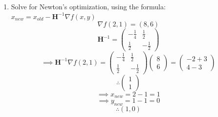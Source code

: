 \documentclass[11pt]{article}
\begin{document}
\begin{enumerate}
\[\begin{pmatrix}
\end{pmatrix} + 
\begin{pmatrix}
-2 \\ 1
\end{pmatrix}
\]
\[
\therefore \begin{pmatrix}
0 \\ 1
\end{pmatrix}
\]
\[
 \implies \begin{pmatrix}
 1 & 0 \\
 0 & 1
 \end{pmatrix}
 \quad  \blacksquare
\]
\item Solve for Newton's optimization, using the formula: $x_{new} = x_{old} - \mathbf{H}^{-1}\nabla f(x, y)$
\[
\nabla f(2,1) = (8, 6) 
\]
\[
\mathbf{H}^{-1}= \begin{pmatrix}
-\frac{1}{4} & \frac{1}{2} \\
\frac{1}{2} & - \frac{1}{2}
\end{pmatrix}
\]
\[
\implies \mathbf{H}^{-1} \nabla f(2,1) =
\begin{pmatrix}
-\frac{1}{4} & \frac{1}{2} \\
\frac{1}{2} & - \frac{1}{2}
\end{pmatrix}
\begin{pmatrix}
8 \\ 6
\end{pmatrix}
=
\begin{pmatrix}
-2 + 3 \\ 
4 - 3
\end{pmatrix}
\]
\[
\therefore \begin{pmatrix}
1 \\ 1
\end{pmatrix}
\]
\[
\implies x_{new} = 2 - 1 = 1
\]
\[
\implies
y_{new} = 1 -1 = 0
\]
\[
\therefore (1, 0)
\]
\end{enumerate}
\end{document}
